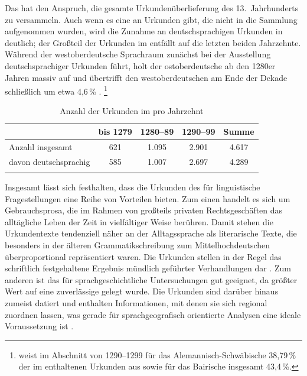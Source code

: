 Das \CAO{} hat den Anspruch, die gesamte
Urkundenüberlieferung des 13.~Jahrhunderts zu
versammeln. Auch wenn es eine  an Urkunden gibt, die nicht in
die Sammlung aufgenommen wurden, wird die Zunahme an deutschsprachigen Urkunden
in  deutlich; der Großteil der Urkunden im \CAO{} entfällt
auf die letzten beiden Jahrzehnte. Während der
westoberdeutsche Sprachraum zunächst
bei der Ausstellung deutschsprachiger Urkunden führt, holt der
ostoberdeutsche ab den 1280er Jahren massiv auf und übertrifft den
westoberdeutschen am Ende der Dekade schließlich um etwa
4,6\,\% \autocite[46--47]{ganslmayer2012}.%
%
	\footnote{\citet[47]{ganslmayer2012} weist im Abschnitt von 1290--1299 für
		das Alemannisch-Schwäbische 38,79\,\%
		der im \CAO{} enthaltenen Urkunden aus sowie für das
		Bairische insgesamt 43,4\,\%. }

\begin{table}
\centering
\caption{Anzahl der Urkunden im 
pro Jahrzehnt \autocite[40]{ganslmayer2012}}
\begin{tabularx}{\textwidth}{l C C C C}
\lsptoprule
%
	& {bis 1279}
	& {1280--89}
	& {1290--99}
	& {Summe}\\

\midrule

Anzahl insgesamt
	& 621
	& 1.095
	& 2.901
	& 4.617
	\\

davon deutschsprachig
	& 585
	& 1.007
	& 2.697
	& 4.289
	\\

\lspbottomrule
\end{tabularx}
\label{tab:urkstat}
\end{table}

Insgesamt lässt sich festhalten, dass die Urkunden des \CAO{} für
linguistische Fragestellungen eine Reihe von Vorteilen bieten. Zum einen
handelt es sich um Gebrauchsprosa, die im Rahmen
von großteils privaten Rechtsgeschäften das alltägliche Leben der Zeit in
vielfältiger Weise berühren. Damit stehen die Urkundentexte tendenziell näher
an der Alltagssprache als literarische Texte, die besonders in der älteren
Grammatikschreibung zum Mittelhochdeutschen überproportional repräsentiert
waren. Die Urkunden stellen in der Regel das schriftlich
festgehaltene Ergebnis mündlich geführter Verhandlungen dar
\autocite[595]{schmidtwiegand1998b}. Zum anderen ist das \CAO{} für
sprachgeschichtliche Untersuchungen gut geeignet, da
größter Wert auf eine zuverlässige  gelegt wurde. Die
Urkunden sind darüber hinaus zumeist datiert und enthalten Informationen, mit
denen sie sich regional zuordnen lassen, was gerade für
sprachgeografisch orientierte Analysen eine ideale
Voraussetzung ist \autocite[22]{schulze2011}.

